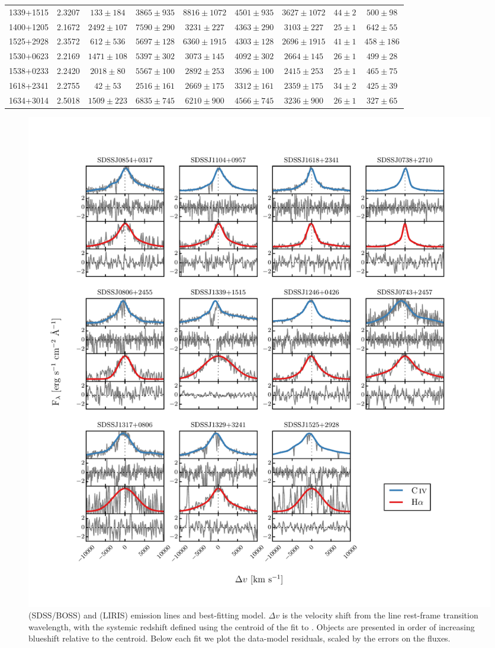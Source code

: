 \begin{table}
\begin{tabular}{ccccccccc}
  1339+1515 & 2.3207 & $133\pm184$ & $3865\pm935$ & $8816\pm1072$ & $4501\pm935$ & $3627\pm1072$ & $44\pm2$ & $500\pm98$ \\
  1400+1205 & 2.1672 & $2492\pm107$ & $7590\pm290$ & $3231\pm227$ & $4363\pm290$ & $3103\pm227$ & $25\pm1$ & $642\pm55$ \\
  1525+2928 & 2.3572 & $612\pm536$ & $5697\pm128$ & $6360\pm1915$ & $4303\pm128$ & $2696\pm1915$ & $41\pm1$ & $458\pm186$ \\
  1530+0623 & 2.2169 & $1471\pm108$ & $5397\pm302$ & $3073\pm145$ & $4092\pm302$ & $2664\pm145$ & $26\pm1$ & $499\pm28$ \\
  1538+0233 & 2.2420 & $2018\pm80$ & $5567\pm100$ & $2892\pm253$ & $3596\pm100$ & $2415\pm253$ & $25\pm1$ & $465\pm75$ \\
  1618+2341 & 2.2755 & $42\pm53$ & $2516\pm161$ & $2669\pm175$ & $3312\pm161$ & $2359\pm175$ & $34\pm2$ & $425\pm39$ \\
  1634+3014 & 2.5018 & $1509\pm223$ & $6835\pm745$ & $6210\pm900$ & $4566\pm745$ & $3236\pm900$ & $26\pm1$ & $327\pm65$ \\
  \hline
  \end{tabular}
\end{table}

\begin{figure}
	\includegraphics[width=\textwidth]{figures/chapter02/gridspectra_1.pdf} %
    \caption{ (SDSS/BOSS) and \ha (LIRIS) emission lines and best-fitting model. $\Delta{v}$ is the velocity shift from the line rest-frame transition wavelength, with the systemic redshift defined using the centroid of the fit to \hans. Objects are presented in order of increasing  blueshift relative to the \ha centroid. Below each fit we plot the data-model residuals, scaled by the errors on the fluxes. }
    \label{fig:gridspectra_1}
\end{figure}

